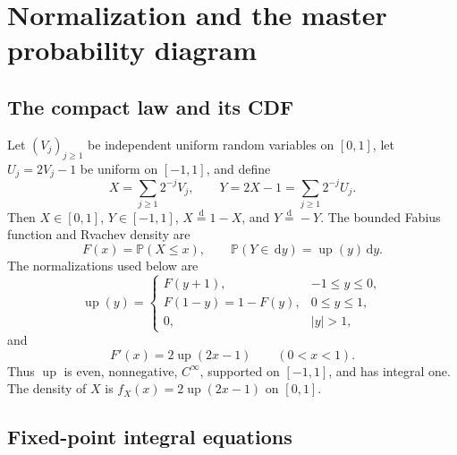 \documentclass[11pt,oneside]{article}
\theoremstyle{definition}
\theoremstyle{remark}
\newcommand{\Prob}{\mathbb P}
\newcommand{\Up}{\operatorname{up}}
\newcommand{\dd}{\,\mathrm d}
\newcommand{\dist}{\mathrel{\stackrel{\mathrm d}=}}
\begin{document}
\section{Normalization and the master probability diagram}
\label{sec:normalization}

\subsection{The compact law and its CDF}

Let $(V_j)_{j\ge1}$ be independent uniform random variables on $[0,1]$, let
$U_j=2V_j-1$ be uniform on $[-1,1]$, and define
\begin{equation}
 X=\sum_{j\ge1}2^{-j}V_j,
 \qquad
 Y=2X-1=\sum_{j\ge1}2^{-j}U_j.                       \label{eq:XY}
\end{equation}
Then $X\in[0,1]$, $Y\in[-1,1]$, $X\dist1-X$, and $Y\dist-Y$.  The bounded Fabius
function and Rvachev density are
\begin{equation}
 F(x)=\Prob(X\le x),
 \qquad
 \Prob(Y\in\dd y)=\Up(y)\dd y.                       \label{eq:F-up-law}
\end{equation}
The normalizations used below are
\begin{equation}
 \Up(y)=
 \begin{cases}
 F(y+1),&-1\le y\le0,\\
 F(1-y)=1-F(y),&0\le y\le1,\\
 0,&|y|>1,
 \end{cases}                                           \label{eq:F-up-link}
\end{equation}
and
\begin{equation}
 F'(x)=2\Up(2x-1)\qquad(0<x<1).                         \label{eq:Fprime-up}
\end{equation}
Thus $\Up$ is even, nonnegative, $C^\infty$, supported on $[-1,1]$, and has integral one.
The density of $X$ is $f_X(x)=2\Up(2x-1)$ on $[0,1]$.

\subsection{Fixed-point integral equations}
\end{document}
